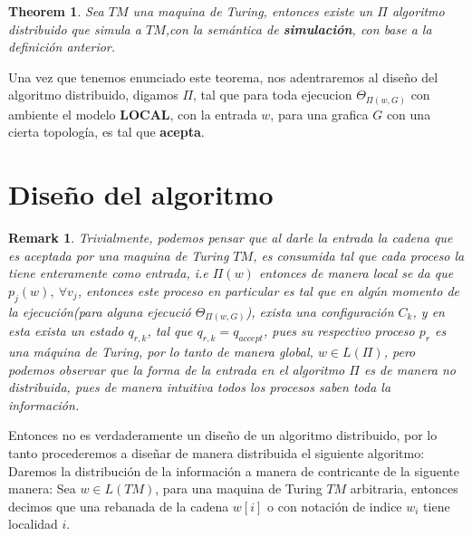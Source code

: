 \documentclass[10pt]{report}
\newtheorem*{remark}{Remark}
\newtheorem{theorem}{Theorem}
\begin{document}
    \begin{theorem}
        Sea $TM$ una maquina de Turing, entonces existe un $\Pi$ algoritmo distribuido que simula
        a $TM$,\space con la semántica de \textbf{simulación}, con base a la definición anterior.
    \end{theorem}
    Una vez que tenemos enunciado este teorema, nos adentraremos al diseño del algoritmo distribuido,
    digamos $\Pi$, tal que para toda ejecucion $\Theta_{\Pi(w,G)}$ con ambiente el modelo \textbf{LOCAL}, con la entrada $w$, para una grafica $G$ con una
    cierta topología, es tal que \textbf{acepta}.
    \newpage

    \section{Diseño del algoritmo}\label{sec:diseño-del-algoritmo}
    \begin{remark}
        Trivialmente, podemos pensar que al darle la entrada la cadena que es aceptada por una maquina de Turing $TM$,\space
        es consumida tal que cada proceso la tiene enteramente como entrada, i.e $\Pi(w)$ entonces de manera local se da
        que $p_{j}(w),\ \forall v_{j}$, entonces este proceso en particular es tal que en algún momento de la ejecución(para alguna ejecució $\Theta_{\Pi(w,G)}$),
        exista una configuración $C_{k}$, y en esta exista un estado $q_{r,k}$, tal que $q_{r,k} = q_{accept}$, pues su respectivo proceso $p_{r}$ es una máquina de Turing,
        por lo tanto de manera global, $w\in L(\Pi)$, pero podemos observar que la forma de la entrada en el algoritmo $\Pi$
        es de manera no distribuida, pues de manera intuitiva todos los procesos saben toda la información.
    \end{remark}
    Entonces no es verdaderamente un diseño de un algoritmo distribuido, por lo tanto procederemos a diseñar de manera
    distribuida el siguiente algoritmo:
    \newline
    Daremos la distribución de la información a manera de contricante de la siguente manera:\newline
    Sea $w\in L(TM)$, para una maquina de Turing $TM$ arbitraria, entonces decimos que una rebanada de la cadena
    $w[i]$ o con notación de indice $w_{i}$ tiene localidad $i$.\newline
\end{document}
